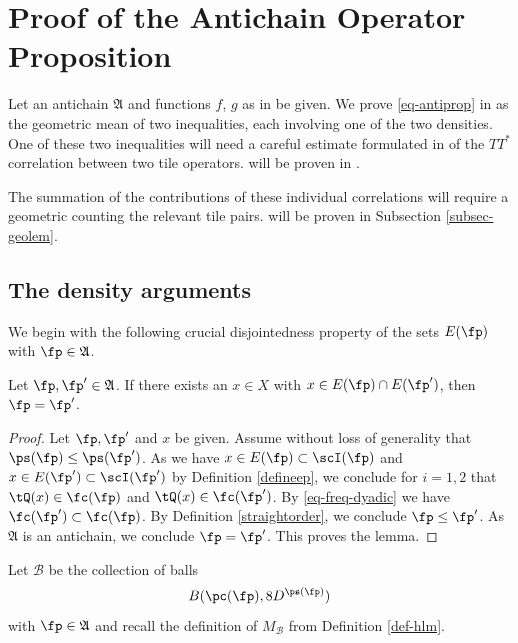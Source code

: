 \chapter{Proof of the Antichain Operator Proposition}

\label{antichainboundary}

Let an antichain $\mathfrak{A}$
and functions $f$, $g$ as in  be given.
We prove \eqref{eq-antiprop}
in 
as the geometric mean of two inequalities,
each involving one of the two densities.
One of these two inequalities will need a careful estimate formulated in
 of
the $TT^*$ correlation between two tile operators.
 will be proven in
.

The summation of the contributions of these individual correlations will require a
geometric  counting the relevant tile pairs.
 will be proven in Subsection
\ref{subsec-geolem}.






\section{The density arguments}\label{sec-TT*-T*T}

We begin with the following crucial disjointedness property of the sets $E(\fp)$ with $\fp \in \mathfrak{A}$.
\begin{lemma}
\label{tile-disjointness}
\leanok
Let $\fp,\fp'\in \mathfrak{A}$.
If there exists an $x\in X$ with $x\in E(\fp)\cap E(\fp')$,
then $\fp= \fp'$.
\end{lemma}
\begin{proof}
\leanok
Let $\fp,\fp'$ and $x$ be given.
Assume without loss of generality that $\ps(\fp)\le \ps(\fp')$.
As we have $x\in E(\fp)\subset \scI(\fp)$ and $x\in E(\fp')\subset \scI(\fp')$ by Definition \eqref{defineep}, we conclude
for $i=1,2$ that
$\tQ(x)\in\fc(\fp)$ and $\tQ(x)\in\fc(\fp')$. By \eqref{eq-freq-dyadic} we have $\fc(\fp')\subset \fc(\fp)$. By Definition
\eqref{straightorder}, we conclude $\fp\le \fp'$. As $\mathfrak{A}$ is an antichain, we conclude $\fp=\fp'$.
This proves the lemma.
\end{proof}



Let $\mathcal{B}$ be the collection of balls
\begin{equation}
    B(\pc(\fp), 8D^{\ps(\fp)})
\end{equation}
with $\fp\in \mathfrak{A}$ and recall the definition of
$M_{\mathcal{B}}$ from Definition \ref{def-hlm}.

